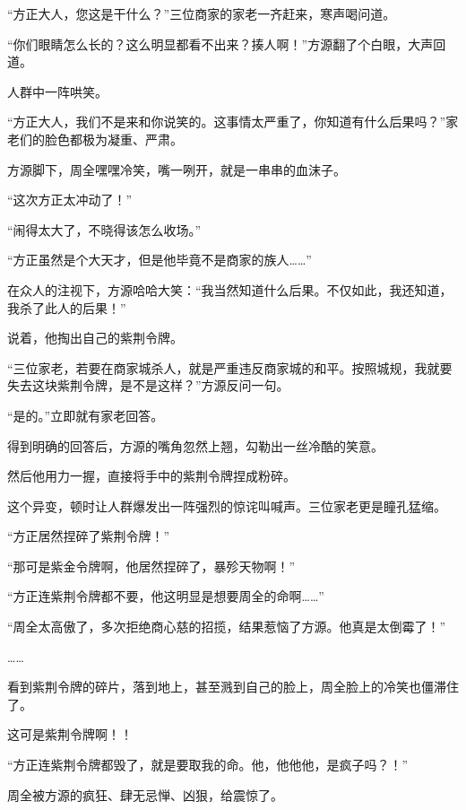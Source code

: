 \begin{this_body}
“方正大人，您这是干什么？”三位商家的家老一齐赶来，寒声喝问道。

“你们眼睛怎么长的？这么明显都看不出来？揍人啊！”方源翻了个白眼，大声回道。

人群中一阵哄笑。

“方正大人，我们不是来和你说笑的。这事情太严重了，你知道有什么后果吗？”家老们的脸色都极为凝重、严肃。

方源脚下，周全嘿嘿冷笑，嘴一咧开，就是一串串的血沫子。

“这次方正太冲动了！”

“闹得太大了，不晓得该怎么收场。”

“方正虽然是个大天才，但是他毕竟不是商家的族人……”

在众人的注视下，方源哈哈大笑：“我当然知道什么后果。不仅如此，我还知道，我杀了此人的后果！”

说着，他掏出自己的紫荆令牌。

“三位家老，若要在商家城杀人，就是严重违反商家城的和平。按照城规，我就要失去这块紫荆令牌，是不是这样？”方源反问一句。

“是的。”立即就有家老回答。

得到明确的回答后，方源的嘴角忽然上翘，勾勒出一丝冷酷的笑意。

然后他用力一握，直接将手中的紫荆令牌捏成粉碎。

这个异变，顿时让人群爆发出一阵强烈的惊诧叫喊声。三位家老更是瞳孔猛缩。

“方正居然捏碎了紫荆令牌！”

“那可是紫金令牌啊，他居然捏碎了，暴殄天物啊！”

“方正连紫荆令牌都不要，他这明显是想要周全的命啊……”

“周全太高傲了，多次拒绝商心慈的招揽，结果惹恼了方源。他真是太倒霉了！”

……

看到紫荆令牌的碎片，落到地上，甚至溅到自己的脸上，周全脸上的冷笑也僵滞住了。

这可是紫荆令牌啊！！

“方正连紫荆令牌都毁了，就是要取我的命。他，他他他，是疯子吗？！”

周全被方源的疯狂、肆无忌惮、凶狠，给震惊了。

\end{this_body}

